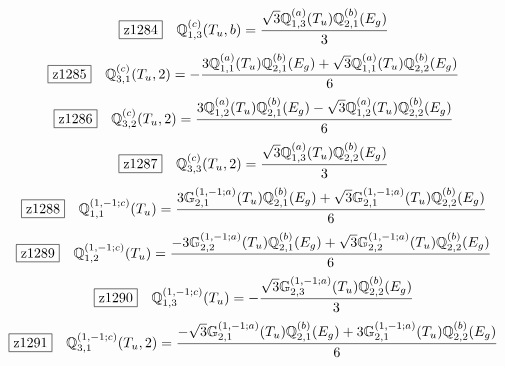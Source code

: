 \documentclass[fleqn,10pt,landscape]{jsarticle}
\begin{document}
\begin{dmath*}
\hspace*{3mm}\fbox{z1284}\quad \mathbb{Q}_{1,3}^{(c)}(T_{u},b)=\frac{\sqrt{3} \mathbb{Q}_{1,3}^{(a)}(T_{u}) \mathbb{Q}_{2,1}^{(b)}(E_{g})}{3}
\end{dmath*}
\begin{dmath*}
\hspace*{3mm}\fbox{z1285}\quad \mathbb{Q}_{3,1}^{(c)}(T_{u},2)=- \frac{3 \mathbb{Q}_{1,1}^{(a)}(T_{u}) \mathbb{Q}_{2,1}^{(b)}(E_{g}) + \sqrt{3} \mathbb{Q}_{1,1}^{(a)}(T_{u}) \mathbb{Q}_{2,2}^{(b)}(E_{g})}{6}
\end{dmath*}
\begin{dmath*}
\hspace*{3mm}\fbox{z1286}\quad \mathbb{Q}_{3,2}^{(c)}(T_{u},2)=\frac{3 \mathbb{Q}_{1,2}^{(a)}(T_{u}) \mathbb{Q}_{2,1}^{(b)}(E_{g}) - \sqrt{3} \mathbb{Q}_{1,2}^{(a)}(T_{u}) \mathbb{Q}_{2,2}^{(b)}(E_{g})}{6}
\end{dmath*}
\begin{dmath*}
\hspace*{3mm}\fbox{z1287}\quad \mathbb{Q}_{3,3}^{(c)}(T_{u},2)=\frac{\sqrt{3} \mathbb{Q}_{1,3}^{(a)}(T_{u}) \mathbb{Q}_{2,2}^{(b)}(E_{g})}{3}
\end{dmath*}
\begin{dmath*}
\hspace*{3mm}\fbox{z1288}\quad \mathbb{Q}_{1,1}^{(1,-1;c)}(T_{u})=\frac{3 \mathbb{G}_{2,1}^{(1,-1;a)}(T_{u}) \mathbb{Q}_{2,1}^{(b)}(E_{g}) + \sqrt{3} \mathbb{G}_{2,1}^{(1,-1;a)}(T_{u}) \mathbb{Q}_{2,2}^{(b)}(E_{g})}{6}
\end{dmath*}
\begin{dmath*}
\hspace*{3mm}\fbox{z1289}\quad \mathbb{Q}_{1,2}^{(1,-1;c)}(T_{u})=\frac{- 3 \mathbb{G}_{2,2}^{(1,-1;a)}(T_{u}) \mathbb{Q}_{2,1}^{(b)}(E_{g}) + \sqrt{3} \mathbb{G}_{2,2}^{(1,-1;a)}(T_{u}) \mathbb{Q}_{2,2}^{(b)}(E_{g})}{6}
\end{dmath*}
\begin{dmath*}
\hspace*{3mm}\fbox{z1290}\quad \mathbb{Q}_{1,3}^{(1,-1;c)}(T_{u})=- \frac{\sqrt{3} \mathbb{G}_{2,3}^{(1,-1;a)}(T_{u}) \mathbb{Q}_{2,2}^{(b)}(E_{g})}{3}
\end{dmath*}
\begin{dmath*}
\hspace*{3mm}\fbox{z1291}\quad \mathbb{Q}_{3,1}^{(1,-1;c)}(T_{u},2)=\frac{- \sqrt{3} \mathbb{G}_{2,1}^{(1,-1;a)}(T_{u}) \mathbb{Q}_{2,1}^{(b)}(E_{g}) + 3 \mathbb{G}_{2,1}^{(1,-1;a)}(T_{u}) \mathbb{Q}_{2,2}^{(b)}(E_{g})}{6}
\end{dmath*}
\end{document}
